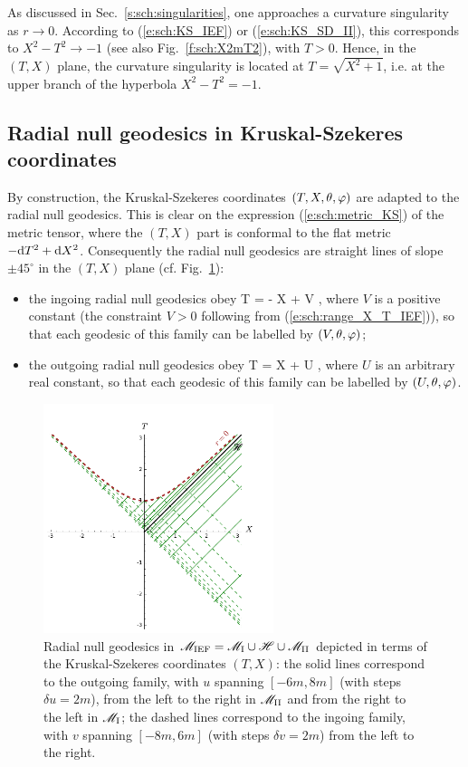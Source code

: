 As discussed in Sec.~\ref{s:sch:singularities}, one approaches a
curvature singularity as $r\rightarrow 0$. According to (\ref{e:sch:KS_IEF})
or (\ref{e:sch:KS_SD_II}),
this corresponds to $X^2-T^2 \rightarrow -1$ (see also Fig.~\ref{f:sch:X2mT2}), with
$T > 0$. Hence, in the $(T,X)$ plane, the curvature singularity is located
at $T = \sqrt{X^2 + 1}$, i.e. at the upper branch of the hyperbola
$X^2 - T^2 = -1$.

\subsection{Radial null geodesics in Kruskal-Szekeres coordinates}
\label{s:sch:rad_null_geod_KS}

By construction, the Kruskal-Szekeres coordinates $(T,X,\theta,\varphi)$ are
adapted to the radial null geodesics. This is clear on the expression
(\ref{e:sch:metric_KS}) of the metric tensor, where the $(T,X)$ part is
conformal to the flat metric $- \mathrm{d} T^2 + \mathrm{d} X^2$. Consequently the radial
null geodesics are straight lines of slope $\pm 45^\circ$ in the $(T,X)$ plane
(cf. Fig.~\ref{f:sch:rad_null_geod_KS}):
\begin{itemize}
\item the ingoing radial null geodesics obey
\be
    T = - X + V ,
\ee
where $V$ is a positive constant (the constraint $V>0$ following from (\ref{e:sch:range_X_T_IEF})), so that each geodesic of this family can be labelled
by $(V,\theta,\varphi)$;
\item the outgoing radial null geodesics obey
\be \label{e:sch:outgoing_null_geod_KS}
    T = X + U ,
\ee
where $U$ is an arbitrary real constant, so that each geodesic of this family can be labelled
by $(U,\theta,\varphi)$.
\end{itemize}
\begin{figure}
\centerline{\includegraphics[width=0.6\textwidth]{sch_rad_null_geod_KS.pdf}}
\caption[]{\label{f:sch:rad_null_geod_KS} \footnotesize
Radial null geodesics in $\mathscr{M}_{\rm IEF} = \mathscr{M}_{\rm I}\cup\mathscr{H}\cup\mathscr{M}_{\rm II}$
depicted in terms of the Kruskal-Szekeres coordinates $(T,X)$: the solid
lines correspond to the outgoing family, with $u$ spanning $[-6m, 8m]$
(with steps $\delta u = 2m$), from the left to the right in $\mathscr{M}_{\rm II}$
and from the right to the left in $\mathscr{M}_{\rm I}$; the dashed lines
correspond to the ingoing family, with $v$ spanning $[-8m, 6m]$ (with steps $\delta v = 2m$)
from the left to the right.}
\end{figure}
